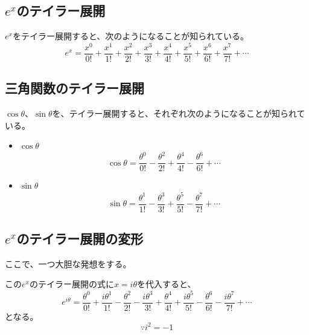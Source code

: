 \documentclass[12pt,a4paper,fleqn]{ltjsarticle}
\begin{document}
\subsection{$e^x$のテイラー展開}
$e^x$をテイラー展開すると、次のようになることが知られている。
\begin{equation*}
    e^x = \frac{x^0}{0!}+\frac{x^1}{1!}+\frac{x^2}{2!}+\frac{x^3}{3!}
        + \frac{x^4}{4!}+\frac{x^5}{5!}+\frac{x^6}{6!}+\frac{x^7}{7!}+\dotsb
\end{equation*}

\subsection{三角関数のテイラー展開}
$\cos \theta$、$\sin \theta$を、テイラー展開すると、それぞれ次のようになることが知られている。
\begin{itemize}
    \item $\cos \theta$
        \begin{equation*}
            \cos \theta = \frac{\theta^0}{0!}-\frac{\theta^2}{2!}
                        + \frac{\theta^4}{4!}-\frac{\theta^6}{6!}+ \dotsb
        \end{equation*}

    \item $\sin \theta$
        \begin{equation*}
            \sin \theta = \frac{\theta^1}{1!}-\frac{\theta^3}{3!}
                        + \frac{\theta^5}{5!}-\frac{\theta^7}{7!}+ \dotsb
        \end{equation*}
\end{itemize}

\newpage

\subsection{$e^x$のテイラー展開の変形}
ここで、一つ大胆な発想をする。

この$e^x$のテイラー展開の式に$x=i\theta$を代入すると、
\begin{equation*}
    e^{i\theta} = \frac{\theta^0}{0!}+\frac{i\theta^1}{1!}-\frac{\theta^2}{2!}
                - \frac{i\theta^3}{3!}+\frac{\theta^4}{4!}+\frac{i\theta^5}{5!}
                - \frac{\theta^6}{6!}-\frac{i\theta^7}{7!}+ \dotsb
\end{equation*}
となる。
\begin{equation*}
    \because i^2 = -1
\end{equation*}
\end{document}
